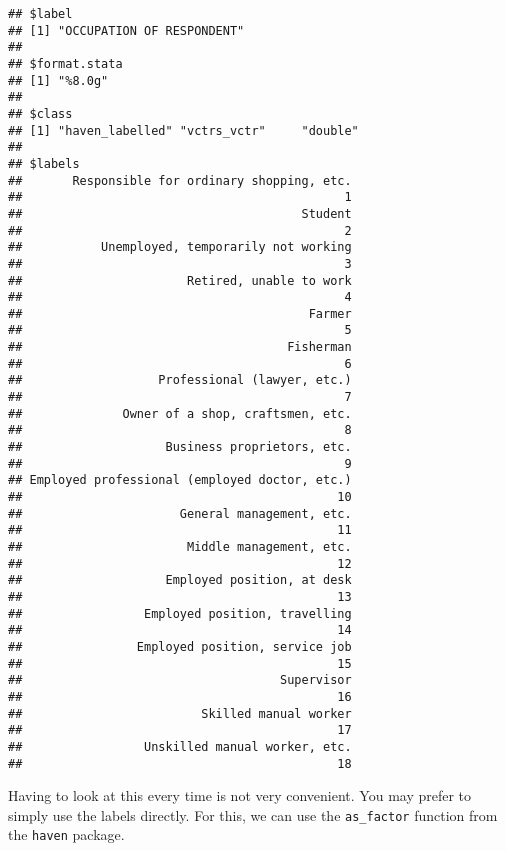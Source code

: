 \documentclass[
]{book}
\newenvironment{Shaded}{\begin{snugshade}}{\end{snugshade}}
\newcommand{\FunctionTok}[1]{\textcolor[rgb]{0.13,0.29,0.53}{\textbf{#1}}}
\newcommand{\NormalTok}[1]{#1}
\newcommand{\OtherTok}[1]{\textcolor[rgb]{0.56,0.35,0.01}{#1}}
\newcommand{\SpecialCharTok}[1]{\textcolor[rgb]{0.81,0.36,0.00}{\textbf{#1}}}
\begin{document}
\begin{verbatim}
## $label
## [1] "OCCUPATION OF RESPONDENT"
## 
## $format.stata
## [1] "%8.0g"
## 
## $class
## [1] "haven_labelled" "vctrs_vctr"     "double"        
## 
## $labels
##       Responsible for ordinary shopping, etc. 
##                                             1 
##                                       Student 
##                                             2 
##           Unemployed, temporarily not working 
##                                             3 
##                       Retired, unable to work 
##                                             4 
##                                        Farmer 
##                                             5 
##                                     Fisherman 
##                                             6 
##                   Professional (lawyer, etc.) 
##                                             7 
##              Owner of a shop, craftsmen, etc. 
##                                             8 
##                    Business proprietors, etc. 
##                                             9 
## Employed professional (employed doctor, etc.) 
##                                            10 
##                      General management, etc. 
##                                            11 
##                       Middle management, etc. 
##                                            12 
##                    Employed position, at desk 
##                                            13 
##                 Employed position, travelling 
##                                            14 
##                Employed position, service job 
##                                            15 
##                                    Supervisor 
##                                            16 
##                         Skilled manual worker 
##                                            17 
##                 Unskilled manual worker, etc. 
##                                            18
\end{verbatim}

Having to look at this every time is not very convenient. You may prefer to simply use the labels directly. For this, we can use the \texttt{as\_factor} function from the \texttt{haven} package.

\begin{Shaded}
\end{Shaded}
\end{document}
